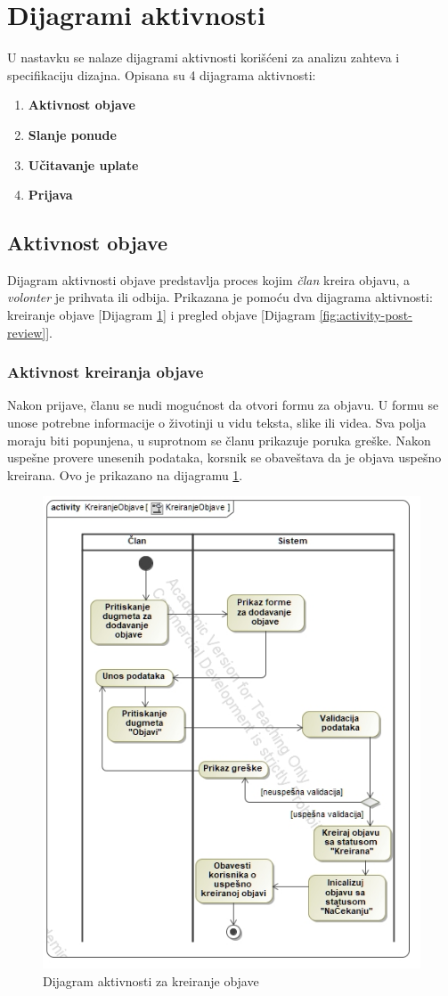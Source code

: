 \section{Dijagrami aktivnosti}
\par U nastavku se nalaze dijagrami aktivnosti korišćeni za analizu zahteva i specifikaciju dizajna.
Opisana su 4 dijagrama aktivnosti:
\begin{enumerate}
    \item \textbf{Aktivnost objave}
    \item \textbf{Slanje ponude}
    \item \textbf{Učitavanje uplate}
    \item \textbf{Prijava}
\end{enumerate}
\subsection{Aktivnost objave}
\par Dijagram aktivnosti objave predstavlja proces kojim \textit{član} kreira objavu, a \textit{volonter} je prihvata ili odbija.
Prikazana je pomoću dva dijagrama aktivnosti: kreiranje objave [Dijagram \ref{fig:activity-create-post}] i pregled objave [Dijagram \ref{fig:activity-post-review}].
\subsubsection*{Aktivnost kreiranja objave}
\par Nakon prijave, članu se nudi mogućnost da otvori formu za objavu. U formu se unose potrebne informacije o životinji u vidu teksta, slike ili videa.
Sva polja moraju biti popunjena, u suprotnom se članu prikazuje poruka greške. Nakon uspešne provere unesenih podataka, korsnik se obaveštava da je 
objava uspešno kreirana. Ovo je prikazano na dijagramu \ref{fig:activity-create-post}.
\begin{figure}[h]
    \centering
    \includegraphics[width=\textwidth, height=0.75\textwidth]{img/activity-create-post.jpg}
    \caption{Dijagram aktivnosti za kreiranje objave}
    \label{fig:activity-create-post}
\end{figure}

